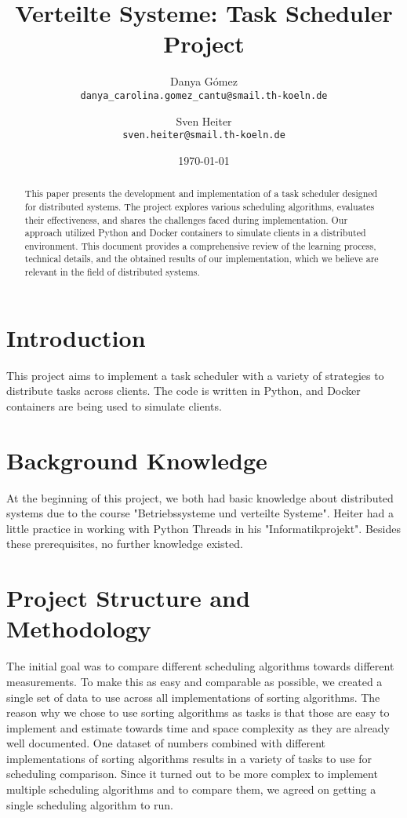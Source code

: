 \documentclass{article}
\title{Verteilte Systeme: Task Scheduler Project}
\author{
    Danya Gómez \\
    \texttt{danya\_carolina.gomez\_cantu@smail.th-koeln.de}
    \and
    Sven Heiter \\
    \texttt{sven.heiter@smail.th-koeln.de}
}
\date{\today}
\begin{document}
\maketitle

\begin{abstract}
This paper presents the development and implementation of a task scheduler designed for distributed systems. The project explores various scheduling algorithms, evaluates their effectiveness, and shares the challenges faced during implementation. Our approach utilized Python and Docker containers to simulate clients in a distributed environment. This document provides a comprehensive review of the learning process, technical details, and the obtained results of our implementation, which we believe are relevant in the field of distributed systems.
\end{abstract}

\newpage

\tableofcontents

\newpage

\section{Introduction}
This project aims to implement a task scheduler with a variety of strategies to distribute tasks across clients. The code is written in Python, and Docker containers are being used to simulate clients.

\section{Background Knowledge}
At the beginning of this project, we both had basic knowledge about distributed systems due to the course "Betriebssysteme und verteilte Systeme". Heiter had a little practice in working with Python Threads in his "Informatikprojekt". Besides these prerequisites, no further knowledge existed.

\section{Project Structure and Methodology}
The initial goal was to compare different scheduling algorithms towards different measurements. To make this as easy and comparable as possible, we created a single set of data to use across all implementations of sorting algorithms. The reason why we chose to use sorting algorithms as tasks is that those are easy to implement and estimate towards time and space complexity as they are already well documented. One dataset of numbers combined with different implementations of sorting algorithms results in a variety of tasks to use for scheduling comparison. Since it turned out to be more complex to implement multiple scheduling algorithms and to compare them, we agreed on getting a single scheduling algorithm to run.
\end{document}
